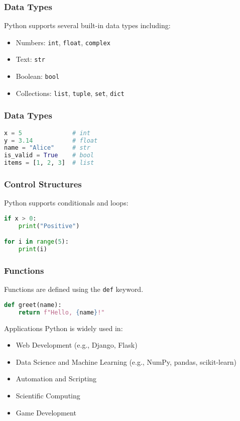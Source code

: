 \begin{frame}[fragile]
\frametitle{Data Types}
Python supports several built-in data types including:
\begin{itemize}
    \item Numbers: \texttt{int}, \texttt{float}, \texttt{complex}
    \item Text: \texttt{str}
    \item Boolean: \texttt{bool}
    \item Collections: \texttt{list}, \texttt{tuple}, \texttt{set}, \texttt{dict}
\end{itemize}
\end{frame}

\begin{frame}[fragile]
\frametitle{Data Types}
\begin{lstlisting}[language=Python]
x = 5              # int
y = 3.14           # float
name = "Alice"     # str
is_valid = True    # bool
items = [1, 2, 3]  # list
\end{lstlisting}
\end{frame}


\begin{frame}[fragile]
\frametitle{Control Structures}
Python supports conditionals and loops:

\begin{lstlisting}[language=python]
if x > 0:
    print("Positive")

for i in range(5):
    print(i)
\end{lstlisting}
\end{frame}



\begin{frame}[fragile]
\frametitle{Functions}
Functions are defined using the \texttt{def} keyword.
\begin{lstlisting}[language=Python]
def greet(name):
    return f"Hello, {name}!"
\end{lstlisting}
\end{frame}


\begin{frame}{Applications}
Python is widely used in:
\begin{itemize}
\item Web Development (e.g., Django, Flask)
\item Data Science and Machine Learning (e.g., NumPy, pandas, scikit-learn)
\item Automation and Scripting
\item Scientific Computing
\item Game Development
\end{itemize}
\end{frame}


